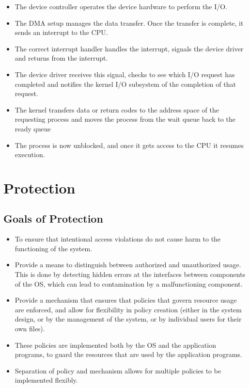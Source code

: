 \documentclass{article}
\theoremstyle{plain}
\theoremstyle{definition}
\begin{document}
\begin{itemize}
\begin{itemize}
        \item The device controller operates the device hardware to perform the I/O. 
        
        \item The DMA setup manages the data transfer. Once the transfer is complete, it sends an interrupt to the CPU. 
        
        \item The correct interrupt handler handles the interrupt, signals the device driver and returns from the interrupt. 
        
        \item The device driver receives this signal, checks to see which I/O request has completed and notifies the kernel I/O subsystem of the completion of that request. 
        
        \item The kernel transfers data or return codes to the address space of the requesting process and moves the process from the wait queue back to the ready queue
        
        \item The process is now unblocked, and once it gets access to the CPU it resumes execution. 
    \end{itemize}
\end{itemize}

\section{Protection}
\subsection{Goals of Protection}
\begin{itemize}
    \item To ensure that intentional access violations do not cause harm to the functioning of the system. 
    
    \item Provide a means to distinguish between authorized and unauthorized usage. This is done by detecting hidden errors at the interfaces between components of the OS, which can lead to contamination by a malfunctioning component. 
    
    \item Provide a mechanism that ensures that policies that govern resource usage are enforced, and allow for flexibility in policy creation (either in the system design, or by the management of the system, or by individual users for their own files).
    
    \item These policies are implemented both by the OS and the application programs, to guard the resources that are used by the application programs.
    
    \item Separation of policy and mechanism allows for multiple policies to be implemented flexibly.
\end{itemize}
\end{document}
